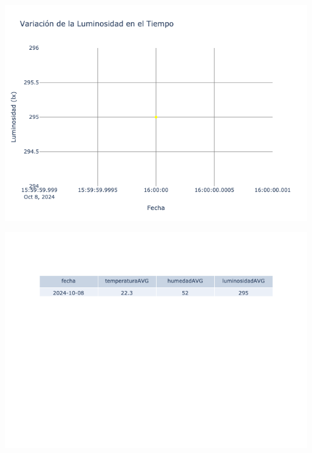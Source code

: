 \documentclass{article}
\begin{document}
    \noindent
    \begin{minipage}{0.48\textwidth}
        \centering
        \includegraphics[width=\textwidth]{../img/poli/LS303-90Dias-03-12-2024.png}
    \end{minipage}
    \hfill
    \begin{minipage}{0.48\textwidth}
        \centering
        \includegraphics[width=\textwidth]{../img/tables/CAVG303-90Dias-03-12-2024.png}
    \end{minipage}
    
\end{document}
